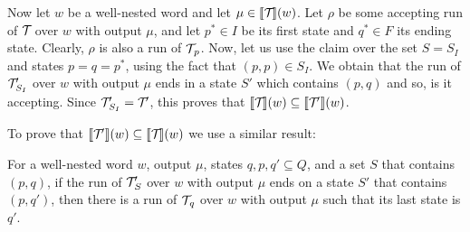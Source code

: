 	Now let $w$ be a well-nested word and let $\mu \in \llbracket \mathcal{T}\! \rrbracket(w)$. Let $\rho$ be some accepting run of $\mathcal{T}\!$ over $w$ with output $\mu$, and let $p^*\in I$ be its first state and $q^*\in F$ its ending state. 
	Clearly, $\rho$ is also a run of $\mathcal{T}\!_p$.
	Now, let us use the claim over the set $S = S_{I}$ and states $p = q = p^*$, using the fact that $(p,p)\in S_{I}$.
	We obtain that the run of $\mathcal{T}\!'_{S_I}$ over $w$ with output $\mu$ ends in a state $S'$ which contains $(p,q)$ and so, is it accepting.
	Since $\mathcal{T}\!'_{S_I} = \mathcal{T}\!'$, this proves that $\llbracket \mathcal{T}\! \rrbracket(w) \subseteq \llbracket \mathcal{T}\!' \rrbracket(w)$.
	
	
	To prove that $\llbracket \mathcal{T}\!' \rrbracket(w) \subseteq \llbracket \mathcal{T}\! \rrbracket(w)$ we use a similar result:
	
	\begin{claim}
		For a well-nested word $w$, output $\mu$, states $q,p,q'\subseteq Q$, and a set $S$ that contains $(p,q)$, if the run of $\mathcal{T}\!'_S$ over $w$ with output $\mu$ ends on a state $S'$ that contains $(p,q')$, then there is a run of $\mathcal{T}\!_q$ over $w$ with output $\mu$ such that its last state is $q'$.
	\end{claim}
